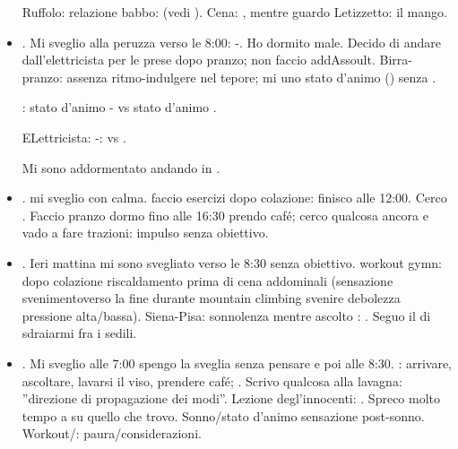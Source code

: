 \begin{itemize}
Ruffolo: relazione babbo:  (vedi ).
Cena: ,  mentre guardo Letizzetto:  il mango.

\item {}. Mi sveglio alla peruzza verso le 8:00: -. Ho dormito male. Decido di andare dall'elettricista per le prese dopo pranzo; non faccio addAssoult. Birra-pranzo: assenza ritmo-indulgere nel tepore;  mi uno stato d'animo () senza .

: stato d'animo - vs stato d'animo .

ELettricista: -:  vs .

Mi sono addormentato andando in .

\item {}. mi sveglio con calma. faccio esercizi dopo colazione: finisco alle 12:00. Cerco . Faccio pranzo dormo fino alle 16:30 prendo caf\'e; cerco qualcosa ancora e vado a fare trazioni: impulso  senza obiettivo.

\item {}. Ieri mattina mi sono svegliato verso le 8:30 senza obiettivo. workout gymn: dopo colazione riscaldamento prima di cena addominali (sensazione svenimentoverso la fine durante mountain climbing svenire debolezza pressione alta/bassa). Siena-Pisa: sonnolenza mentre ascolto : . Seguo il  di sdraiarmi fra i sedili.

\item {}. Mi sveglio alle 7:00 spengo la sveglia senza pensare e poi alle 8:30. : arrivare, ascoltare, lavarsi il viso, prendere caf\'e; . Scrivo qualcosa alla lavagna: ''direzione di propagazione dei modi''.
Lezione degl'innocenti: .
Spreco molto tempo a  su quello che trovo.
Sonno/stato d'animo sensazione post-sonno.
Workout/: paura/considerazioni.


\end{itemize}
